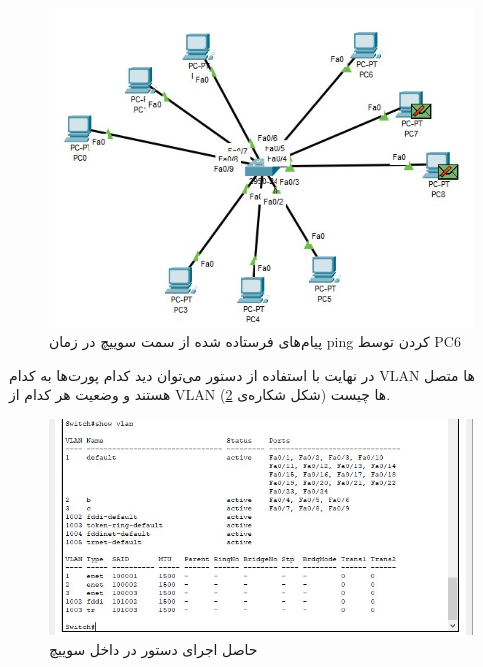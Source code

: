 \documentclass{article}
\begin{document}
\begin{figure}[h!]
	\centering
	\includegraphics[width=0.6\columnwidth]{6.jpg}
	\caption{پیام‌های فرستاده شده از سمت سوییچ در زمان ping کردن توسط PC6}
	\label{fig:scenario-7}
\end{figure}

در نهایت با استفاده از دستور \textit{} می‌توان دید کدام پورت‌ها به کدام VLAN ها متصل هستند و وضعیت هر کدام از VLAN ها چیست (شکل شکاره‌ی \ref{fig:scenario-8}).

\begin{figure}[h!]
	\centering
	\includegraphics[width=0.6\columnwidth]{8.jpg}
	\caption{حاصل اجرای‌ دستور \textit{} در داخل سوییچ}
	\label{fig:scenario-8}
\end{figure}
\end{document}
